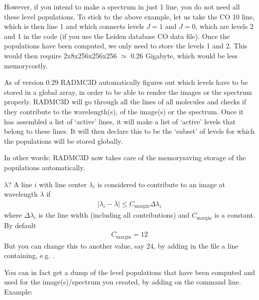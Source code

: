 \documentclass[letterpaper,10pt,english]{sphinxmanual}
\begin{document}
However, if you intend to make a spectrum in just 1 line, you do not need all
these level populations. To stick to the above example, let us take the CO 1\sphinxhyphen{}0
line, which is then line 1 and which connects levels \(J=1\) and
\(J=0\), which are levels 2 and 1 in the code (if you use the Leiden
database CO data file).  Once the populations have been computed, we only need
to store the levels 1 and 2. This would then require 2x8x256x256x256
\(\simeq\) 0.26 Gigabyte, which would be  less memory\sphinxhyphen{}costly.

As of version 0.29 RADMC\sphinxhyphen{}3D automatically figures out which levels have to
be stored in a global array, in order to be able to render the images or the
spectrum properly. RADMC\sphinxhyphen{}3D will go through all the lines of all molecules
and checks if they contribute to the wavelength(s), of the image(s) or the
spectrum. Once it has assembled a list of ‘active’ lines, it will make a
list of ‘active’ levels that belong to these lines. It will then declare
this to be the ‘subset’ of levels for which the populations will be stored
globally.

In other words: RADMC\sphinxhyphen{}3D now takes care of the memory\sphinxhyphen{}saving storage of
the populations automatically.

\(\lambda\)? A line \(i\) with line center \(\lambda_i\) is
considered to contribute to an image at wavelength \(\lambda\) if
\begin{equation*}
\begin{split}| \lambda_i-\lambda | \le C_{\mathrm{margin}}\Delta\lambda_i\end{split}
\end{equation*}
where \(\Delta\lambda_i\) is the line width (including all contributions)
and \(C_{\mathrm{margin}}\) is a constant. By default
\begin{equation*}
\begin{split}C_{\mathrm{margin}} = 12\end{split}
\end{equation*}
But you can change this to another value, say 24, by adding in the
 file a line containing, e.g. .

You can in fact get a dump of the level populations that have been computed and
used for the image(s)/spectrum you created, by adding  on the
command line. Example:
\end{document}
